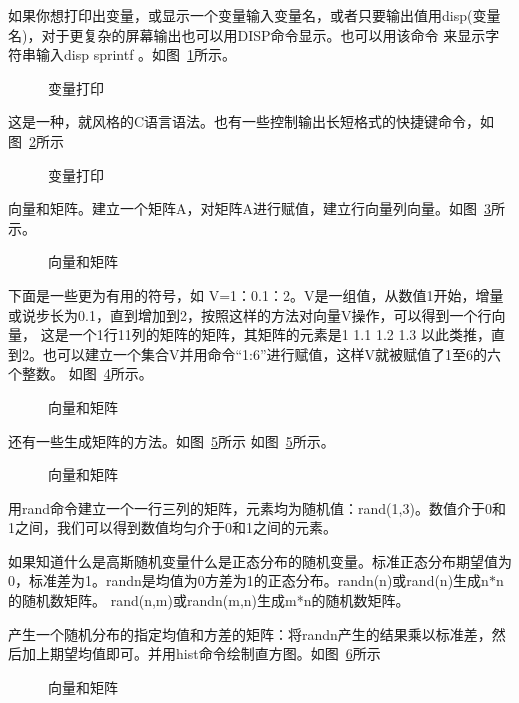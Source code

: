 \documentclass[UTF8]{ctexart}
\begin{document}
如果你想打印出变量，或显示一个变量输入变量名，或者只要输出值用disp(变量名)，对于更复杂的屏幕输出也可以用DISP命令显示。也可以用该命令
来显示字符串输入disp sprintf 。如图~\ref{fig:8}所示。
\begin{figure}[H]
 \caption{变量打印}
 \label{fig:8}
 \end{figure}

这是一种，就风格的C语言语法。也有一些控制输出长短格式的快捷键命令，如图~\ref{fig:9}所示
\begin{figure}[H]
 \caption{变量打印}
 \label{fig:9}
 \end{figure}

向量和矩阵。建立一个矩阵A，对矩阵A进行赋值，建立行向量列向量。如图~\ref{fig:10}所示。
\begin{figure}[H]
 \caption{向量和矩阵}
 \label{fig:10}
 \end{figure}

下面是一些更为有用的符号，如 V=1：0.1：2。V是一组值，从数值1开始，增量或说步长为0.1，直到增加到2，按照这样的方法对向量V操作，可以得到一个行向量，
这是一个1行11列的矩阵的矩阵，其矩阵的元素是1 1.1 1.2 1.3 以此类推，直到2。也可以建立一个集合V并用命令``1:6''进行赋值，这样V就被赋值了1至6的六个整数。
如图~\ref{fig:11}所示。
\begin{figure}[H]
 \caption{向量和矩阵}
 \label{fig:11}
 \end{figure}

还有一些生成矩阵的方法。如图~\ref{fig:12}所示
如图~\ref{fig:12}所示。
\begin{figure}[H]
 \caption{向量和矩阵}
 \label{fig:12}
 \end{figure}

用rand命令建立一个一行三列的矩阵，元素均为随机值：rand(1,3)。数值介于0和1之间，我们可以得到数值均匀介于0和1之间的元素。

如果知道什么是高斯随机变量什么是正态分布的随机变量。标准正态分布期望值为0，标准差为1。randn是均值为0方差为1的正态分布。randn(n)或rand(n)生成n$\ast$n的随机数矩阵。
rand(n,m)或randn(m,n)生成m*n的随机数矩阵。

产生一个随机分布的指定均值和方差的矩阵：将randn产生的结果乘以标准差，然后加上期望均值即可。并用hist命令绘制直方图。如图~\ref{fig:13}所示
\begin{figure}[H]
 \caption{向量和矩阵}
 \label{fig:13}
 \end{figure}
\end{document}
